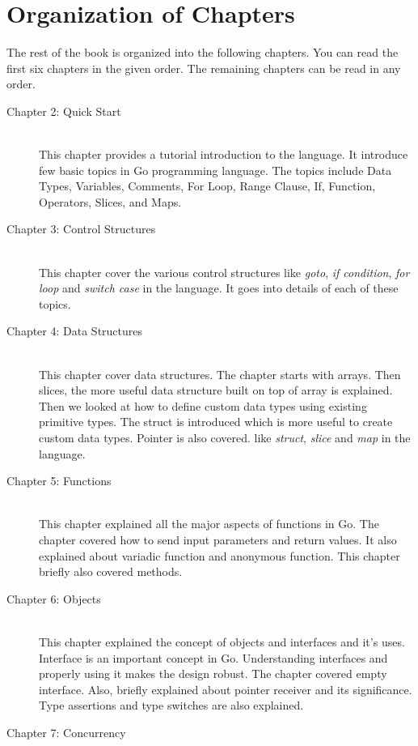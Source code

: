 \section{Organization of Chapters}

The rest of the book is organized into the following chapters. You can read the
first six chapters in the given order. The remaining chapters can be read in any
order.

\begin{description}
\item[Chapter 2: Quick Start] \hfill \\
This chapter provides a tutorial introduction to the language. It introduce few
basic topics in Go programming language. The topics include Data Types,
Variables, Comments, For Loop, Range Clause, If, Function, Operators, Slices,
and Maps.
\item[Chapter 3: Control Structures] \hfill \\
This chapter cover the various control structures like \textit{goto}, \textit{if
condition}, \textit{for loop} and \textit{switch case} in the language. It goes
into details of each of these topics.
\item[Chapter 4: Data Structures] \hfill \\
This chapter cover data structures. The chapter starts with arrays. Then slices,
the more useful data structure built on top of array is explained. Then we
looked at how to define custom data types using existing primitive types. The
struct is introduced which is more useful to create custom data types. Pointer
is also covered. like \textit{struct}, \textit{slice} and \textit{map} in the
language.
\item[Chapter 5: Functions] \hfill \\
This chapter explained all the major aspects of functions in Go. The chapter
covered how to send input parameters and return values. It also explained about
variadic function and anonymous function. This chapter briefly also covered
methods.
\item[Chapter 6: Objects] \hfill \\
This chapter explained the concept of objects and interfaces and it's uses.
Interface is an important concept in Go. Understanding interfaces and properly
using it makes the design robust. The chapter covered empty interface. Also,
briefly explained about pointer receiver and its significance. Type assertions
and type switches are also explained.
\item[Chapter 7: Concurrency] \hfill \\

\end{description}
